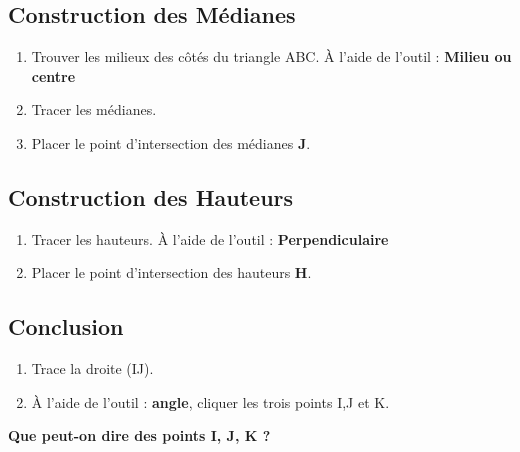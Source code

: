 \documentclass[11pt]{article}
\begin{document}
\subsection{Construction des Médianes}
\begin{enumerate}
\item Trouver les milieux des côtés du triangle ABC.
À l'aide de l'outil : \textbf{Milieu ou centre}
\item Tracer les médianes.
\item Placer le point d'intersection des médianes \textbf{J}.
\end{enumerate}

\subsection{Construction des Hauteurs}
\begin{enumerate}
\item Tracer les hauteurs.
À l'aide de l'outil : \textbf{Perpendiculaire}\\
\item Placer le point d'intersection des hauteurs \textbf{H}.
\end{enumerate}

\subsection{Conclusion}
\begin{enumerate}
\item Trace la droite (IJ).
\item À l'aide de l'outil : \textbf{angle}, cliquer les trois points I,J et K.\\
\end{enumerate}
\textbf{Que peut-on dire des points I, J, K ?}
\end{document}

